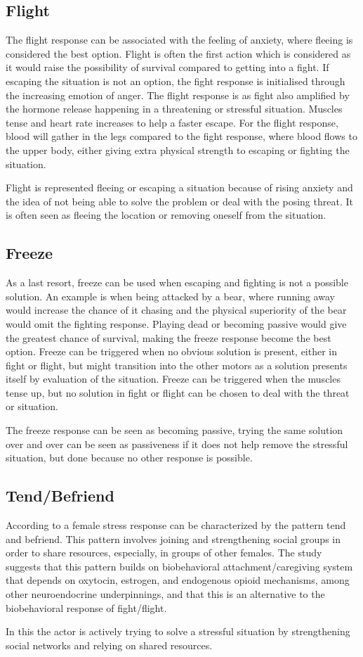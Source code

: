 \subsection{Flight}
The flight response can be associated with the feeling of anxiety, where fleeing is considered the best option. Flight is often the first action which is considered as it would raise the possibility of survival compared to getting into a fight. If escaping the situation is not an option, the fight response is initialised through the increasing emotion of anger. The flight response is as fight also amplified by the hormone release happening in a threatening or stressful situation. Muscles tense and heart rate increases to help a faster escape. For the flight response, blood will gather in the legs compared to the fight response, where blood flows to the upper body, either giving extra physical strength to escaping or fighting the situation. 

Flight is represented fleeing or escaping a situation because of rising anxiety and the idea of not being able to solve the problem or deal with the posing threat. It is often seen as fleeing the location or removing oneself from the situation.

\subsection{Freeze}
As a last resort, freeze can be used when escaping and fighting is not a possible solution. An example is when being attacked by a bear, where running away would increase the chance of it chasing and the physical superiority of the bear would omit the fighting response. Playing dead or becoming passive would give the greatest chance of survival, making the freeze response become the best option. Freeze can be triggered when no obvious solution is present, either in fight or flight, but might transition into the other motors as a solution presents itself by evaluation of the situation. Freeze can be triggered when the muscles tense up, but no solution in fight or flight can be chosen to deal with the threat or situation.

The freeze response can be seen as becoming passive, trying the same solution over and over can be seen as passiveness if it does not help remove the stressful situation, but done because no other response is possible.

\subsection{Tend/Befriend}
According to \cite{tendbefriend} a female stress response can be characterized by the pattern tend and befriend. This pattern involves joining and strengthening social groups in order to share resources, especially, in groups of other females. The study suggests that this pattern builds on biobehavioral attachment/caregiving system that depends on oxytocin, estrogen, and endogenous opioid mechanisms, among other neuroendocrine underpinnings, and that this is an alternative to the biobehavioral response of fight/flight. 

In this the actor is actively trying to solve a stressful situation by strengthening social networks and relying on shared resources. \cite{tendbefriend}

